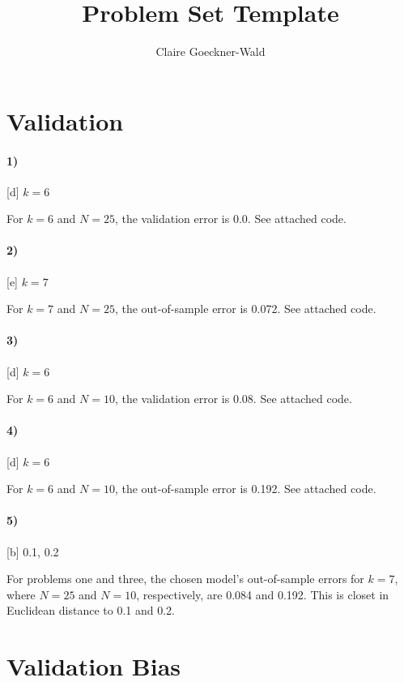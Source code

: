 \documentclass[10pt,letter]{article}
\begin{document}
\title{Problem Set Template}
\author{Claire Goeckner-Wald}
\maketitle 

\section*{Validation}

\paragraph{1)} [d] $k = 6$

	For $k = 6$ and $N = 25$, the validation error is 0.0. See attached code. 

\paragraph{2)} [e] $k = 7$

	For $k = 7$ and $N = 25$, the out-of-sample error is 0.072. See attached code. 

\paragraph{3)} [d] $k = 6$

	For $k = 6$ and $N = 10$, the validation error is 0.08. See attached code. 

\paragraph{4)} [d] $k = 6$

	For $k = 6$ and $N = 10$, the out-of-sample error is 0.192. See attached code. 

\paragraph{5)} [b] 0.1, 0.2

	For problems one and three, the chosen model's out-of-sample errors for $k=7$, where $N=25$ and $N=10$, respectively, are 0.084 and 0.192. This is closet in Euclidean distance to 0.1 and 0.2.

\section*{Validation Bias}
\end{document}
